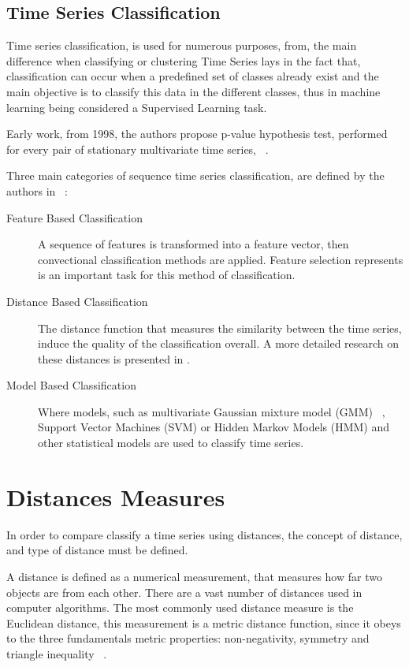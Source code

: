 

\subsection{Time Series Classification}
Time series classification, is used for numerous purposes, from, the main difference when classifying or clustering Time Series lays in the fact that, classification can occur when a predefined set of classes already exist and the main objective is to classify this data in the different classes, thus in machine learning being considered a Supervised Learning task. 

Early work, from 1998, the authors propose p-value hypothesis test, performed for every pair of stationary multivariate time series, ~\cite{MTS1999}.

Three main categories of sequence time series classification, are defined by the authors in ~\cite{MTS_Classification}:

\begin{description}
\item[Feature Based Classification] A sequence of features is transformed into a feature vector, then convectional classification methods are applied. Feature selection represents is an important task for this method of classification.

\item [Distance Based Classification] The distance function that measures the
similarity between the time series, induce the quality of the classification overall. A more detailed research on these distances is presented in \cite{Knorr2000}.

\item [Model Based Classification] Where models, such as multivariate Gaussian mixture model (GMM) ~\cite{Laxhammar2008}, Support Vector Machines (SVM) or Hidden Markov Models (HMM) and other statistical models are used to classify time series.

\end{description}
 

\section{Distances Measures}
In order to compare classify a time series using distances, the concept of distance, and type of distance must be defined.

A distance is defined as a numerical measurement, that measures how far two objects are from each other. There are a vast number of distances used in computer algorithms. The most commonly used distance measure is the Euclidean distance, this measurement is a metric distance function, since it obeys to the three fundamentals metric properties: non-negativity, symmetry and triangle inequality ~\cite{Cai2004}. 

